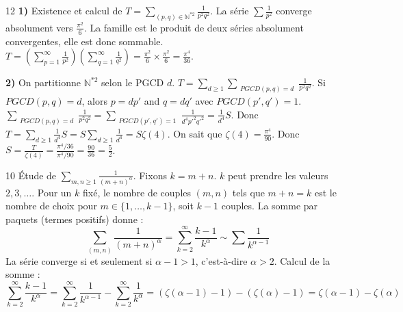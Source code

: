 \begin{correction}{12}
\textbf{1)} Existence et calcul de $T = \sum_{(p,q)\in\mathbb{N}^{*2}}\frac{1}{p^{2}q^{2}}$.
La série $\sum \frac{1}{p^2}$ converge absolument vers $\frac{\pi^2}{6}$.
La famille est le produit de deux séries absolument convergentes, elle est donc sommable.
$T = (\sum_{p=1}^\infty \frac{1}{p^2}) (\sum_{q=1}^\infty \frac{1}{q^2}) = \frac{\pi^2}{6} \times \frac{\pi^2}{6} = \frac{\pi^4}{36}$.

\textbf{2)} On partitionne $\mathbb{N}^{*2}$ selon le PGCD $d$.
$T = \sum_{d \ge 1} \sum_{\substack{PGCD(p,q)=d}} \frac{1}{p^2 q^2}$.
Si $PGCD(p,q)=d$, alors $p=dp'$ and $q=dq'$ avec $PGCD(p',q')=1$.
$\sum_{\substack{PGCD(p,q)=d}} \frac{1}{p^2 q^2} = \sum_{\substack{PGCD(p',q')=1}} \frac{1}{d^4 p'^2 q'^2} = \frac{1}{d^4} S$.
Donc $T = \sum_{d \ge 1} \frac{1}{d^4} S = S \sum_{d \ge 1} \frac{1}{d^4} = S \zeta(4)$.
On sait que $\zeta(4) = \frac{\pi^4}{90}$.
Donc $S = \frac{T}{\zeta(4)} = \frac{\pi^4/36}{\pi^4/90} = \frac{90}{36} = \frac{5}{2}$.
\end{correction}

\begin{correction}{10}
Étude de $\sum_{m,n \ge 1} \frac{1}{(m+n)^\alpha}$.
Fixons $k = m+n$. $k$ peut prendre les valeurs $2, 3, \dots$.
Pour un $k$ fixé, le nombre de couples $(m,n)$ tels que $m+n=k$ est le nombre de choix pour $m \in \{1, \dots, k-1\}$, soit $k-1$ couples.
La somme par paquets (termes positifs) donne :
$$ \sum_{(m,n)} \frac{1}{(m+n)^\alpha} = \sum_{k=2}^\infty \frac{k-1}{k^\alpha} \sim \sum \frac{1}{k^{\alpha-1}} $$
La série converge si et seulement si $\alpha-1 > 1$, c'est-à-dire $\alpha > 2$.
Calcul de la somme :
$$ \sum_{k=2}^\infty \frac{k-1}{k^\alpha} = \sum_{k=2}^\infty \frac{1}{k^{\alpha-1}} - \sum_{k=2}^\infty \frac{1}{k^\alpha} = (\zeta(\alpha-1)-1) - (\zeta(\alpha)-1) = \zeta(\alpha-1) - \zeta(\alpha) $$
\end{correction}

